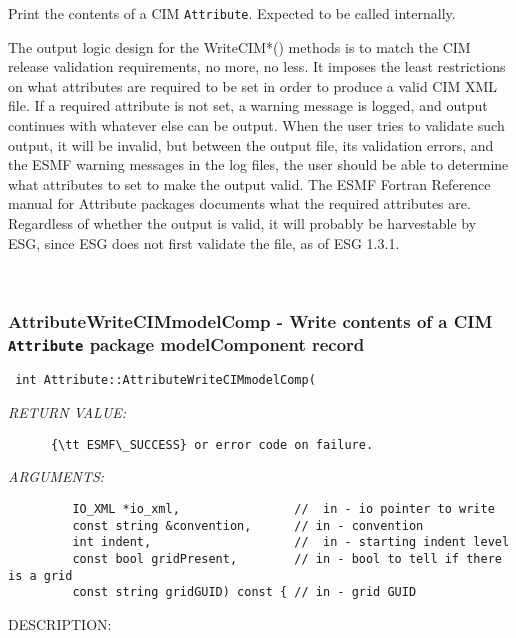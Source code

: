       Print the contents of a CIM {\tt Attribute}.  Expected to be
      called internally.
  
      The output logic design for the WriteCIM*() methods is to match the CIM
      release validation requirements, no more, no less.  It imposes the least
      restrictions on what attributes are required to be set in order to
      produce a valid CIM XML file.  If a required attribute is not set, a
      warning message is logged, and output continues with whatever else can be
      output.  When the user tries to validate such output, it will be invalid,
      but between the output file, its validation errors, and the ESMF warning
      messages in the log files, the user should be able to determine what
      attributes to set to make the output valid.  The ESMF Fortran Reference
      manual for Attribute packages documents what the required attributes are.
      Regardless of whether the output is valid, it will probably be
      harvestable by ESG, since ESG does not first validate the file, as of
      ESG 1.3.1.
   
 
\mbox{}\hrulefill\
 
\subsubsection [AttributeWriteCIMmodelComp] {AttributeWriteCIMmodelComp - Write contents of a CIM {\tt Attribute} package modelComponent record}


  
\begin{verbatim} int Attribute::AttributeWriteCIMmodelComp(\end{verbatim}{\em RETURN VALUE:}
\begin{verbatim}      {\tt ESMF\_SUCCESS} or error code on failure.\end{verbatim}{\em ARGUMENTS:}
\begin{verbatim}         IO_XML *io_xml,                //  in - io pointer to write
         const string &convention,      // in - convention
         int indent,                    //  in - starting indent level
         const bool gridPresent,        // in - bool to tell if there is a grid
         const string gridGUID) const { // in - grid GUID\end{verbatim}
{\sf DESCRIPTION:\\ }


